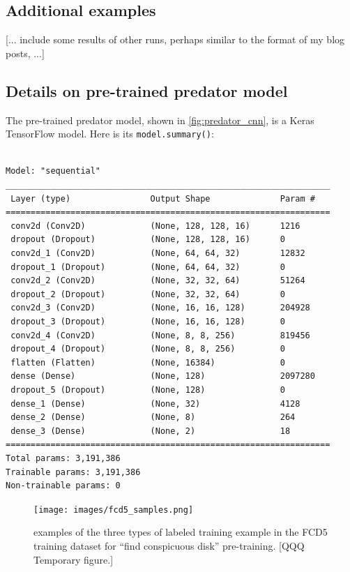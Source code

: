 \documentclass[acmtog]{acmart}
\begin{document}
\subsection{Additional examples}
[... include some results of other runs, perhaps similar to the format of my blog posts,  ...]

\subsection{Details on pre-trained predator model}
The pre-trained predator model, shown in \ref{fig:predator_cnn}, is a Keras TensorFlow model. Here is its \texttt{model.summary()}:
\begin{adjustwidth}{1cm}{0cm}
\begin{small}
\begin{verbatim}

Model: "sequential"
_________________________________________________________________
 Layer (type)                Output Shape              Param #
=================================================================
 conv2d (Conv2D)             (None, 128, 128, 16)      1216
 dropout (Dropout)           (None, 128, 128, 16)      0
 conv2d_1 (Conv2D)           (None, 64, 64, 32)        12832
 dropout_1 (Dropout)         (None, 64, 64, 32)        0
 conv2d_2 (Conv2D)           (None, 32, 32, 64)        51264
 dropout_2 (Dropout)         (None, 32, 32, 64)        0
 conv2d_3 (Conv2D)           (None, 16, 16, 128)       204928
 dropout_3 (Dropout)         (None, 16, 16, 128)       0
 conv2d_4 (Conv2D)           (None, 8, 8, 256)         819456
 dropout_4 (Dropout)         (None, 8, 8, 256)         0
 flatten (Flatten)           (None, 16384)             0
 dense (Dense)               (None, 128)               2097280
 dropout_5 (Dropout)         (None, 128)               0
 dense_1 (Dense)             (None, 32)                4128
 dense_2 (Dense)             (None, 8)                 264
 dense_3 (Dense)             (None, 2)                 18
=================================================================
Total params: 3,191,386
Trainable params: 3,191,386
Non-trainable params: 0
\end{verbatim}
\end{small}
\end{adjustwidth}

\begin{figure}
    \texttt{[image: images/fcd5\_samples.png]}
    \caption{examples of the three types of labeled training example in the FCD5 training dataset for “find conspicuous disk” pre-training.  [QQQ Temporary figure.]}
    \label{fig:fcd5_samples}
\end{figure}

\end{document}
